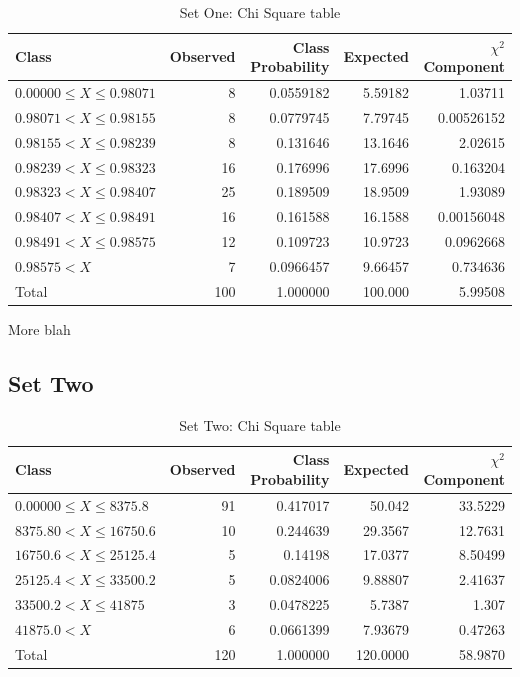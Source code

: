 \documentclass[10pt]{report}
\begin{document}
\begin{table}[h!]
	\centering
	\begin{tabular}{|l|r|r|r|r|}
		\hline
		Class & Observed & Class Probability & Expected & $\chi^2$ Component    \\
		\hline
		$0.00000 \leq X \leq 0.98071 $ &  8 & 0.0559182 &  5.59182 & 1.03711    \\
		$0.98071 < X \leq 0.98155    $ &  8 & 0.0779745 &  7.79745 & 0.00526152 \\
		$0.98155 < X \leq 0.98239    $ &  8 & 0.131646  & 13.1646  & 2.02615    \\
		$0.98239 < X \leq 0.98323    $ & 16 & 0.176996  & 17.6996  & 0.163204   \\
		$0.98323 < X \leq 0.98407    $ & 25 & 0.189509  & 18.9509  & 1.93089    \\
		$0.98407 < X \leq 0.98491    $ & 16 & 0.161588  & 16.1588  & 0.00156048 \\
		$0.98491 < X \leq 0.98575    $ & 12 & 0.109723  & 10.9723  & 0.0962668  \\
		$0.98575 <    X              $ &  7 & 0.0966457 &  9.66457 & 0.734636   \\
		\hline
		Total                          &100 & 1.000000  & 100.000  & 5.99508    \\              
		\hline 
	\end{tabular}
	\caption{Set One: Chi Square table}
\end{table}


More blah




\subsection*{Set Two}

\begin{table}[h!]
	\centering
	\begin{tabular}{|l|r|r|r|r|}
		\hline
		Class & Observed & Class Probability & Expected & $\chi^2$ Component  \\
		\hline
		$0.00000 \leq X \leq  8375.8 $ & 91 & 0.417017  & 50.042   & 33.5229  \\
		$8375.80 < X \leq  16750.6   $ & 10 & 0.244639  & 29.3567  & 12.7631  \\
		$16750.6 < X \leq  25125.4   $ &  5 & 0.14198   & 17.0377  &  8.50499 \\
		$25125.4 < X \leq  33500.2   $ &  5 & 0.0824006 &  9.88807 &  2.41637 \\
		$33500.2 < X \leq  41875     $ &  3 & 0.0478225 &  5.7387  &  1.307   \\
		$41875.0 < X                 $ &  6 & 0.0661399 &  7.93679 &  0.47263 \\
		\hline
		Total                          &120 & 1.000000  & 120.0000 & 58.9870  \\              
		\hline
	\end{tabular}
	\caption{Set Two: Chi Square table}
\end{table}
\end{document}

